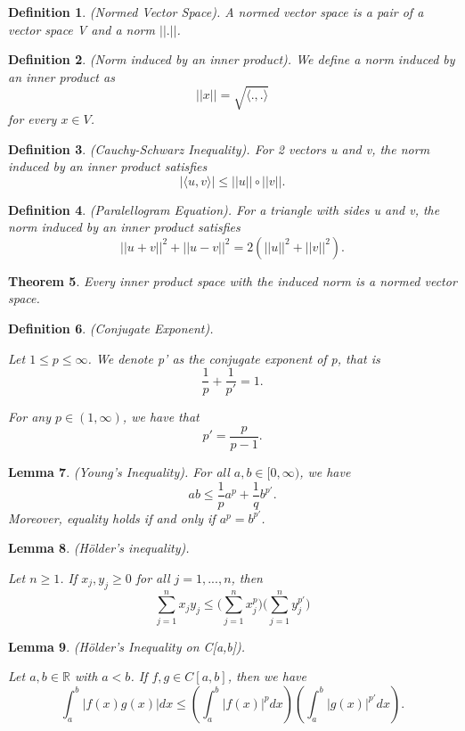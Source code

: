 \documentclass[twoside]{article}
\newcounter{lecnum}
\newtheorem{theorem}{Theorem}[lecnum]
\newtheorem{lemma}[theorem]{Lemma}
\newtheorem{definition}[theorem]{Definition}
\begin{document}
\begin{definition}(Normed Vector Space). A normed vector space is a pair of a vector space V and a norm $||.||$.
\end{definition}

\begin{definition}(Norm induced by an inner product). We define a norm induced by an inner product as
$$
||x|| = \sqrt{\langle ., . \rangle}
$$
for every $x \in V$.
\end{definition}


\begin{definition}(Cauchy-Schwarz Inequality). For 2 vectors u and v, the norm induced by an inner product satisfies
$$
|\langle u, v \rangle| \leq ||u||\circ||v||.
$$
\end{definition}


\begin{definition}(Paralellogram Equation). For a triangle with sides u and v, the norm induced by an inner product satisfies
$$
||u + v||^2 + ||u - v||^2 = 2(||u||^2 + ||v||^2).
$$
\end{definition}

\begin{theorem}Every inner product space with the induced norm is a normed vector space.
\end{theorem}

\begin{definition}(Conjugate Exponent). 

Let $1 \leq p \leq \infty$. We denote p' as the conjugate exponent of p, that is
$$
\frac{1}{p} + \frac{1}{p'} = 1.
$$

For any $p \in (1,\infty)$, we have that
$$
p' = \frac{p}{p-1}.
$$
\end{definition}

\begin{lemma}(Young's Inequality).
For all $a, b \in [0, \infty)$, we have
$$
ab \leq \frac{1}{p}a^{p} + \frac{1}{q}b^{p'}.
$$
Moreover, equality holds if and only if $a^{p} = b^{p'}$.
\end{lemma}

\begin{lemma}(Hölder's inequality).

Let $n \geq 1$. If $x_j, y_j \geq 0$ for all $j = 1,...,n$, then
$$
\sum_{j=1}^{n}x_jy_j \leq \big(\sum_{j=1}^nx_j^{p}\big)\big(\sum_{j=1}^ny_j^{p'}\big)
$$
\end{lemma}

\begin{lemma}(Hölder's Inequality on C[a,b]).

Let $a, b \in \mathbb{R}$ with $a < b$. If $f, g \in C[a,b]$, then we have
$$
\int_a^b|f(x)g(x)|dx \leq (\int_a^{b}|f(x)|^{p}dx)(\int_a^b|g(x)|^{p'}dx).
$$

\end{lemma}
\end{document}
